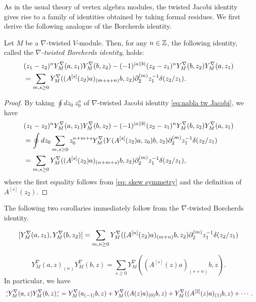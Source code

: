\documentclass[final,reqno]{amsart}
\begin{document}
As in the usual theory of vertex algebra modules, the twisted Jacobi identity gives rise to a family of identities obtained by taking formal residues. We first derive the following analogue of the Borcherds identity.
\begin{prp}\label{prp:nabla tw Borcherds identity}
    Let $M$ be a $\nabla$-twisted $V$-module. Then, for any $n\in\mathbb{Z}$, the following identity, called the \emph{$\nabla$-twisted Borcherds identity}, holds:
    \begin{equation}\label{eq: nabla tw Borcherds identity}
        \begin{split}
            &(z_1-z_2)^nY^\nabla_M(a,z_1)Y^\nabla_M(b,z_2)-(-1)^{\left| a \right|\left| b \right|}(z_2-z_1)^nY^\nabla_M(b,z_2)Y^\nabla_M(a,z_1)\\
            &=\sum_{m,s\geq 0}Y^\nabla_M((A^{[s]}(z_2)a)_{(m+s+n)}b,z_2)\partial_2^{(m)}z_1^{-1}\delta(z_2/z_1).
        \end{split}
    \end{equation}
\end{prp}

\begin{proof}
    By taking $\oint dz_0\ z_0^n$ of $\nabla$-twisted Jacobi identity \cref{eq:nabla tw Jacobi}, we have 
    \begin{align*}
        &(z_1-z_2)^nY^\nabla_M(a,z_1)Y^\nabla_M(b,z_2)-(-1)^{\left| a \right|\left| b \right|}(z_2-z_1)^nY^\nabla_M(b,z_2)Y^\nabla_M(a,z_1)\\
        &=\oint dz_0\sum_{m,s\geq 0}z_0^{n+m+s}Y^\nabla_M(Y(A^{[s]}(z_2)a,z_0)b,z_2)\partial_2^{(m)}z_1^{-1}\delta(z_2/z_1)\\
        &=\sum_{m,s\geq 0}Y^\nabla_M((A^{[s]}(z_2)a)_{(n+m+s)}b,z_2)\partial_2^{(m)}z_1^{-1}\delta(z_2/z_1),
    \end{align*}
    where the first equality follows from \cref{eq: skew symmetry} and the definition of $A^{[s]}(z_2)$. 
\end{proof}

The following two corollaries immediately follow from the $\nabla$-twisted Borcherds identity.
\begin{cor}\label{cor: comm formula}
    \begin{equation}\label{eq: comm formula}
        [Y^\nabla_M(a,z_1),Y^\nabla_M(b,z_2)]=\sum_{m,n\geq 0}Y^\nabla_M((A^{[n]}(z_2)a)_{(m+n)}b,z_2)\partial_2^{(m)}z_1^{-1}\delta(z_2/z_1)
    \end{equation}
\end{cor}

\begin{cor}\label{cor: n-th product}
    \begin{equation}\label{eq: n-th product}
        Y^\nabla_M(a,z)_{(n)}Y^\nabla_M(b,z)=\sum_{s\geq 0}Y^\nabla_M((A^{[s]}(z)a)_{(s+n)}b,z).
    \end{equation}
    In particular, we have
    \begin{equation}\label{eq: normally ordered product}
        \,\substack{\scriptscriptstyle\circ \\ \scriptscriptstyle\circ} Y^\nabla_M(a,z)Y^\nabla_M(b,z) \substack{\scriptscriptstyle\circ \\ \scriptscriptstyle\circ\,}=Y^\nabla_M(a_{(-1)}b,z)+Y^\nabla_M((A(z)a)_{(0)}b,z)+Y^\nabla_M((A^{[2]}(z)a)_{(1)}b,z)+\cdots.
    \end{equation}
\end{cor}
\end{document}
